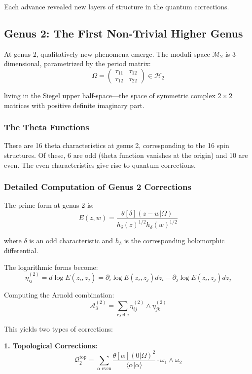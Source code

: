 Each advance revealed new layers of structure in the quantum corrections.

\subsection{Genus 2: The First Non-Trivial Higher Genus}

At genus 2, qualitatively new phenomena emerge. The moduli space $\mathcal{M}_2$ is 3-dimensional, parametrized by the period matrix:
$$\Omega = \begin{pmatrix} \tau_{11} & \tau_{12} \\ \tau_{12} & \tau_{22} \end{pmatrix} \in \mathcal{H}_2$$

living in the Siegel upper half-space—the space of symmetric complex $2 \times 2$ matrices with positive definite imaginary part.

\subsubsection{The Theta Functions}

There are 16 theta characteristics at genus 2, corresponding to the 16 spin structures. Of these, 6 are odd (theta function vanishes at the origin) and 10 are even. The even characteristics give rise to quantum corrections.

\subsubsection{Detailed Computation of Genus 2 Corrections}

The prime form at genus 2 is:
$$E(z,w) = \frac{\theta[\delta](z-w|\Omega)}{h_\delta(z)^{1/2} h_\delta(w)^{1/2}}$$

where $\delta$ is an odd characteristic and $h_\delta$ is the corresponding holomorphic differential.

The logarithmic forms become:
$$\eta_{ij}^{(2)} = d\log E(z_i, z_j) = \partial_i \log E(z_i, z_j) dz_i - \partial_j \log E(z_i, z_j) dz_j$$

Computing the Arnold combination:
$$\mathcal{A}_3^{(2)} = \sum_{\text{cyclic}} \eta_{ij}^{(2)} \wedge \eta_{jk}^{(2)}$$

This yields two types of corrections:

\textbf{1. Topological Corrections:}
$$\mathcal{Q}_2^{\text{top}} = \sum_{\alpha \text{ even}} \frac{\theta[\alpha](0|\Omega)^2}{\langle \alpha | \alpha \rangle} \cdot \omega_1 \wedge \omega_2$$

